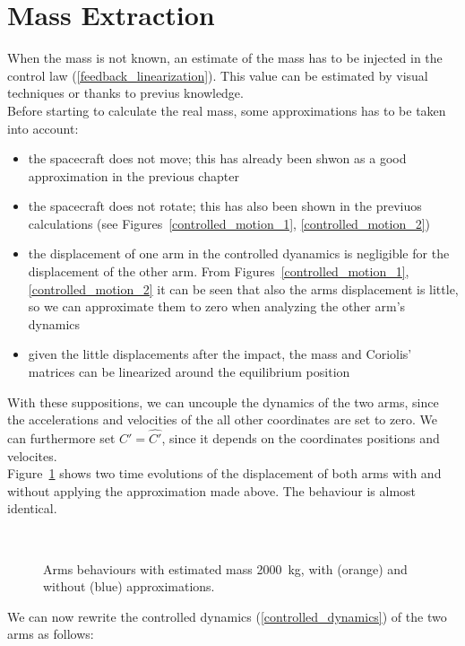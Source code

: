 \documentclass[a4paper,12pt,oneside]{report}
\begin{document}
\section{Mass Extraction}
When the mass is not known, an estimate of the mass has to be injected in the control law (\ref{feedback_linearization}). This value can be estimated by visual techniques or thanks to previus knowledge.\\
Before starting to calculate the real mass, some approximations has to be taken into account:
\begin{itemize}
  \item the spacecraft does not move; this has already been shwon as a good approximation in the previous chapter
  \item the spacecraft does not rotate; this has also been shown in the previuos calculations (see Figures~\ref{controlled_motion_1}, \ref{controlled_motion_2})
  \item the displacement of one arm in the controlled dyanamics is negligible for the displacement of the other arm. From Figures~\ref{controlled_motion_1}, \ref{controlled_motion_2} it can be seen that also the arms displacement is little, so we can approximate them to zero when analyzing the other arm's dynamics
  \item given the little displacements after the impact, the mass and Coriolis' matrices can be linearized around the equilibrium position
\end{itemize}
With these suppositions, we can uncouple the dynamics of the two arms, since the accelerations and velocities of the all other coordinates are set to zero. We can furthermore set $C'=\hat{C'}$, since it depends on the coordinates positions and velocites.\\
Figure~\ref{approximations} shows two time evolutions of the displacement of both arms with and without applying the approximation made above. The behaviour is almost identical.\\
\begin{figure}
  \centering
   \\
  \caption{Arms behaviours with estimated mass \SI{2000}{\kilogram}, with (orange) and without (blue) approximations.}
  \label{approximations}
\end{figure}
We can now rewrite the controlled dynamics (\ref{controlled_dynamics}) of the two arms as follows:
\end{document}
